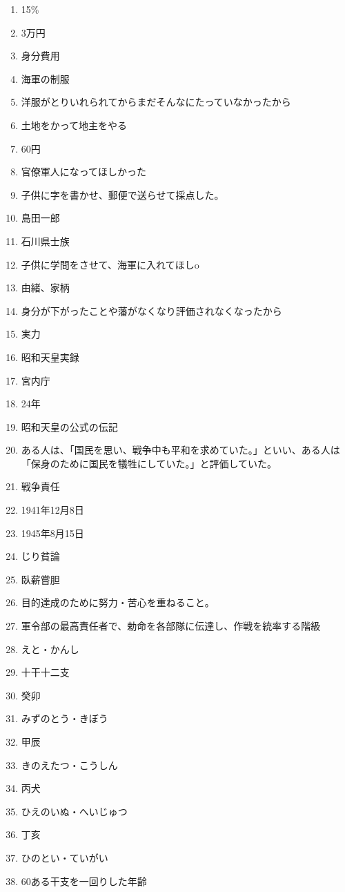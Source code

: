 \documentclass[]{jsarticle}
\begin{document}
\begin{enumerate}
	\item 15\%
	\item 3万円
	\item 身分費用
	\item 海軍の制服
	\item 洋服がとりいれられてからまだそんなにたっていなかったから
	\item 土地をかって地主をやる
	\item 60円
	\item 官僚軍人になってほしかった
	\item 子供に字を書かせ、郵便で送らせて採点した。
	\item 島田一郎
	\item 石川県士族
	\item 子供に学問をさせて、海軍に入れてほしo
	\item 由緒、家柄
	\item 身分が下がったことや藩がなくなり評価されなくなったから
	\item 実力
		\\
	\item 昭和天皇実録
	\item 宮内庁
	\item 24年
	\item 昭和天皇の公式の伝記
	\item ある人は、「国民を思い、戦争中も平和を求めていた。」といい、ある人は「保身のために国民を犠牲にしていた。」と評価していた。
	\item 戦争責任
	\item 1941年12月8日
	\item 1945年8月15日
	\item じり貧論
	\item 臥薪嘗胆
	\item 目的達成のために努力・苦心を重ねること。
	\item 軍令部の最高責任者で、勅命を各部隊に伝達し、作戦を統率する階級
		\\
	\item えと・かんし
	\item 十干十二支
	\item 癸卯
	\item みずのとう・きぼう
	\item 甲辰
	\item きのえたつ・こうしん
	\item 丙犬
	\item ひえのいぬ・へいじゅつ
	\item 丁亥
	\item ひのとい・ていがい
	\item 60ある干支を一回りした年齢

\end{enumerate}
\end{document}
